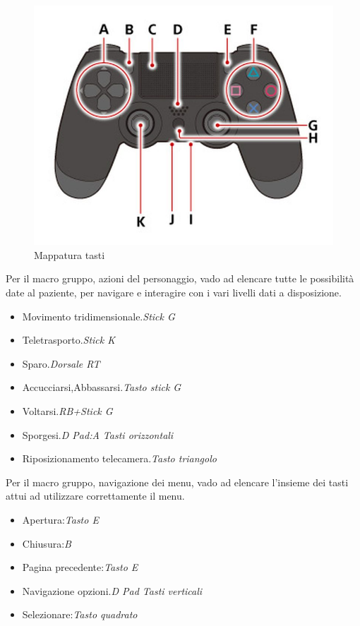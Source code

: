 \documentclass[
a4paper,
cleardoublepage=empty,
headings=twolinechapter,
numbers=autoenddot,
]{scrbook}
\begin{document}
     \begin{figure}[h]
     	\centering
     	\includegraphics[width=0.8\linewidth]{image/gamepad_tasti}
     	\caption{Mappatura tasti}
     	\label{fig:gamepad_tasti}
     \end{figure}
      Per il macro gruppo, azioni del personaggio, vado ad elencare tutte le possibilità date al paziente, per navigare e interagire con i vari livelli dati a disposizione.
     \begin{itemize}
     	\item Movimento tridimensionale.\textit{Stick G}
     	\item Teletrasporto.\textit{Stick K}
     	\item Sparo.\textit{Dorsale RT}
     	\item Accucciarsi,Abbassarsi.\textit{Tasto stick G}
     	\item Voltarsi.\textit{RB+Stick G}
     	\item Sporgesi.\textit{D Pad:A Tasti orizzontali}
     	\item Riposizionamento telecamera.\textit{Tasto triangolo}
     \end{itemize}
     Per il macro gruppo, navigazione dei menu, vado ad elencare l'insieme dei tasti attui ad utilizzare correttamente il menu.
      \begin{itemize}
     	\item Apertura:\textit{Tasto E}
     	\item Chiusura:\textit{B}
     	\item Pagina precedente:\textit{Tasto E}
     	\item Navigazione opzioni.\textit{D Pad Tasti verticali}
     	\item Selezionare:\textit{Tasto quadrato}
     \end{itemize}
\end{document}
